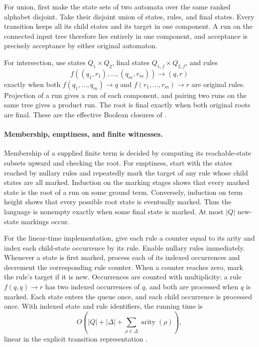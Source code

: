 For union, first make the state sets of two automata over the same
ranked alphabet disjoint.  Take their disjoint union of states, rules,
and final states.  Every transition keeps all its child states and
its target in one component.  A run on the connected input tree
therefore lies entirely in one component, and acceptance is precisely
acceptance by either original automaton.

For intersection, use states \(Q_1\times Q_2\), final states
\(Q_{1,f}\times Q_{2,f}\), and rules
\[
 f((q_1,r_1),\ldots,(q_m,r_m))\to(q,r)
\]
exactly when both \(f(q_1,\ldots,q_m)\to q\) and
\(f(r_1,\ldots,r_m)\to r\) are original rules.
Projection of a run gives a run of each component, and pairing
two runs on the same tree gives a product run.
The root is final exactly when both original roots are final.
These are the effective Boolean closures of
\cite[Theorem~1.3.1]{ComonEtAl2007}.

\paragraph{Membership, emptiness, and finite witnesses.}
\label{sec:p09-finite-tree-emptiness}
Membership of a supplied finite term is decided by computing its
reachable-state subsets upward and checking the root.
For emptiness, start with the states reached by nullary rules and
repeatedly mark the target of any rule whose child states are all marked.
Induction on the marking stages shows that every marked state is
the root of a run on some ground term.
Conversely, induction on term height shows that every possible root
state is eventually marked.
Thus the language is nonempty exactly when some final state is marked.
At most \(|Q|\) new-state markings occur.

For the linear-time implementation, give each rule a counter equal
to its arity and index each child-state occurrence by its rule.
Enable nullary rules immediately.
Whenever a state is first marked, process each of its indexed
occurrences and decrement the corresponding rule counter.
When a counter reaches zero, mark the rule's target if it is new.
Occurrences are counted with multiplicity: a rule
\(f(q,q)\to r\) has two indexed occurrences of \(q\), and both are
processed when \(q\) is marked.
Each state enters the queue once, and each child occurrence is
processed once.  With indexed state and rule identifiers, the running
time is
\[
 O\!\left(|Q|+|\Delta|+\sum_{\rho\in\Delta}
                                 \operatorname{arity}(\rho)\right),
\]
linear in the explicit transition representation
\cite[Theorem~1.7.4]{ComonEtAl2007}.


